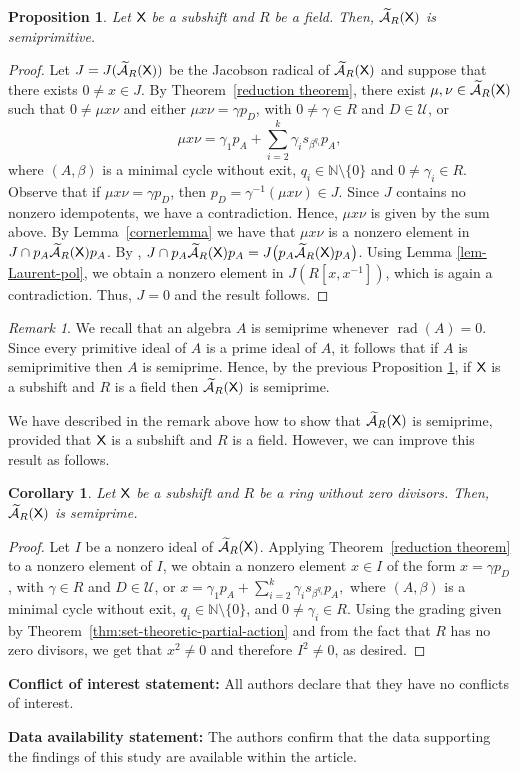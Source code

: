 \documentclass[a4paper,12pt]{amsart}
\newtheorem{proposition}[equation]{Proposition}
\newtheorem{corollary}[equation]{Corollary}
\theoremstyle{definition}
\theoremstyle{remark}
\newtheorem{remark}[equation]{Remark}
\numberwithin{equation}{section}
\newcommand{\osf}{{\normalfont \textsf{X}}}
\newcommand{\ualgshift}{\TCA_R(\osf)}
\newcommand{\N}{\mathbb{N}}
\newcommand{\CA}{\mathcal{A}}
\newcommand{\TCA}{\widetilde{\CA}}
\newcommand{\TCB}{\mathcal{U}}
\begin{document}
\begin{proposition}\label{ecologico} Let $\osf$ be a subshift and $R$ be a field. Then, $\ualgshift$ is semiprimitive.
 \end{proposition}
\begin{proof}
Let $J=J(\ualgshift)$ be the Jacobson radical of $\ualgshift$ and suppose that there exists $0\neq x\in J$.  By 
Theorem~\ref{reduction theorem}, there exist $\mu,\nu\in \ualgshift$ such that  $0\neq \mu x\nu$ and either $\mu x\nu=\gamma p_D$, with $0\neq \gamma\in R$ and $D\in \TCB$, or 
 \[    \mu x\nu=\gamma_1 p_A +\sum\limits_{i=2}^k \gamma_i s_{\beta^{q_i}}p_A,
\]
where $(A,\beta)$ is a minimal cycle without exit, $q_i\in \N\setminus \{0\}$ and $0\neq \gamma_i\in R$. Observe that if $\mu x\nu=\gamma p_D$, then  
$p_D=\gamma^{-1}(\mu x\nu)\in J$. Since $J$ contains no nonzero idempotents, we have a contradiction. Hence, $\mu x\nu$ is given by the sum above. By Lemma~\ref{cornerlemma} we have that $\mu x\nu$ is a nonzero element in $J\cap p_A\ualgshift p_A$. By \cite[\S III.7, Proposition 1]{Jac64}, $J\cap p_A\ualgshift p_A=J\big(p_A\ualgshift p_A\big)$. Using Lemma \ref{lem-Laurent-pol}, we obtain a nonzero element in $J(R[x,x^{-1}])$, which is again a contradiction. Thus, $J=0$ and the result follows.
\end{proof}


\begin{remark}\label{jacare}
We recall that an algebra $A$ is semiprime whenever $\operatorname{rad}(A)=0$. Since every primitive ideal of $A$ is a prime ideal of $A$, it follows that if $A$ is semiprimitive then $A$ is semiprime. Hence, by the previous Proposition \ref{ecologico}, if  $\osf$ is a subshift and $R$ is a field then $\ualgshift$ is semiprime.
\end{remark}

We have described in the remark above how to show that $\ualgshift$ is semiprime, provided that $\osf$ is a subshift and $R$ is a field. However, we can improve this result as follows.

\begin{corollary}\label{banana} Let $\osf$ be a subshift and $R$ be a ring without zero divisors. Then, $\ualgshift$ is semiprime.
\end{corollary}

\begin{proof} Let $I$ be a nonzero ideal of $\ualgshift$. Applying Theorem~\ref{reduction theorem} to a nonzero element of $I$, we obtain a nonzero element $x\in I$ of the form $x=\gamma p_D$, with $\gamma\in R$ and $D\in \TCB$, or 
$x=\gamma_1 p_A +\sum\limits_{i=2}^k \gamma_i s_{\beta^{q_i}}p_A,$
where $(A,\beta)$ is a minimal cycle without exit, $q_i\in \N\setminus \{0\}$, and $0\neq \gamma_i\in R$. Using the grading given by Theorem~\ref{thm:set-theoretic-partial-action} and from the fact that $R$ has no zero divisors, we get that $x^2\neq 0$ and therefore $I^2\neq 0$, as desired.
\end{proof}


{\bf Conflict of interest statement:}
All authors declare that they have no conflicts of interest. 

{\bf Data availability statement:}  The authors confirm that the data supporting the findings of this study are available within the article.



\end{document}
